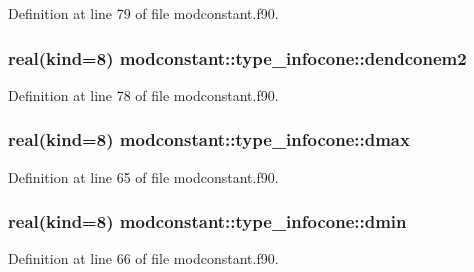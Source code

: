 Definition at line 79 of file modconstant.\+f90.

\subsubsection[{\texorpdfstring{dendconem2}{dendconem2}}]{\setlength{\rightskip}{0pt plus 5cm}real(kind=8) modconstant\+::type\+\_\+infocone\+::dendconem2}\hypertarget{structmodconstant_1_1type__infocone_a106c87e477c927a94a7569eebf80c7b8}{}\label{structmodconstant_1_1type__infocone_a106c87e477c927a94a7569eebf80c7b8}


Definition at line 78 of file modconstant.\+f90.

\subsubsection[{\texorpdfstring{dmax}{dmax}}]{\setlength{\rightskip}{0pt plus 5cm}real(kind=8) modconstant\+::type\+\_\+infocone\+::dmax}\hypertarget{structmodconstant_1_1type__infocone_af05af8480c2822e1a826aa9f178cc03e}{}\label{structmodconstant_1_1type__infocone_af05af8480c2822e1a826aa9f178cc03e}


Definition at line 65 of file modconstant.\+f90.

\subsubsection[{\texorpdfstring{dmin}{dmin}}]{\setlength{\rightskip}{0pt plus 5cm}real(kind=8) modconstant\+::type\+\_\+infocone\+::dmin}\hypertarget{structmodconstant_1_1type__infocone_aabcbf5e2b15937b2ffbc97cfdc173fa3}{}\label{structmodconstant_1_1type__infocone_aabcbf5e2b15937b2ffbc97cfdc173fa3}


Definition at line 66 of file modconstant.\+f90.

